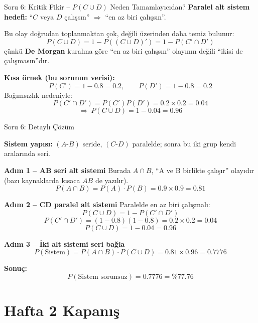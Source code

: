 \documentclass[light]{lutbeamer}
\begin{document}
\begin{frame}{Soru 6: Kritik Fikir -- $P(C\cup D)$ Neden Tamamlayıcıdan?}
    \small
    \textbf{Paralel alt sistem hedefi:} ``$C$ veya $D$ çalışsın'' $\Rightarrow$ ``en az biri çalışsın''.
    
    \vspace{0.1cm}
    Bu olay doğrudan toplanmaktan çok, değili üzerinden daha temiz bulunur:
    \[
    P(C\cup D)=1-P((C\cup D)')=1-P(C'\cap D')
    \]
    çünkü \textbf{De Morgan} kuralına göre ``en az biri çalışsın'' olayının değili ``ikisi de çalışmasın''dır.
    
    \vspace{0.1cm}
    \textbf{Kısa örnek (bu sorunun verisi):}
    \[
    P(C')=1-0.8=0.2,\qquad P(D')=1-0.8=0.2
    \]
    Bağımsızlık nedeniyle:
    \[
    P(C'\cap D')=P(C')P(D')=0.2\times 0.2=0.04
    \]
    \[
    \Rightarrow\ P(C\cup D)=1-0.04=0.96
    \]
\end{frame}

\begin{frame}[allowframebreaks]{Soru 6: Detaylı Çözüm}
    \scriptsize
    {\color{red}
    \textbf{Sistem yapısı:} $(A\text{-}B)$ seride, $(C\text{-}D)$ paralelde; sonra bu iki grup kendi aralarında seri.
    
    \vspace{0.1cm}
    \textbf{Adım 1 -- AB seri alt sistemi}
    Burada $A \cap B$, ``A ve B birlikte çalışır'' olayıdır (bazı kaynaklarda kısaca $AB$ de yazılır).
    \[
    P(A\cap B)=P(A)\cdot P(B)=0.9\times 0.9=0.81
    \]
    
    \vspace{0.1cm}
    \textbf{Adım 2 -- CD paralel alt sistemi}
    Paralelde en az biri çalışmalı:
    \[
    P(C\cup D)=1-P(C'\cap D')
    \]
    \[
    P(C'\cap D')=(1-0.8)(1-0.8)=0.2\times 0.2=0.04
    \]
    \[
    P(C\cup D)=1-0.04=0.96
    \]
    
    \vspace{0.1cm}
    \textbf{Adım 3 -- İki alt sistemi seri bağla}
    \[
    P(\text{Sistem})=P(A\cap B)\cdot P(C\cup D)=0.81\times 0.96=0.7776
    \]
    
    \vspace{0.1cm}
    \textbf{Sonuç:}
    \[
    \boxed{P(\text{Sistem sorunsuz})=0.7776=\%77.76}
    \]
    }
\end{frame}

\section{Hafta 2 Kapanış}
\end{document}
